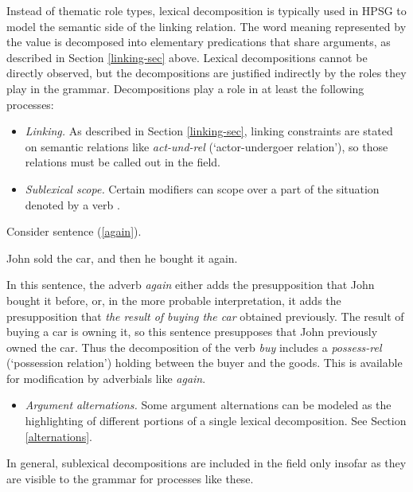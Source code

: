 \documentclass[output=paper
	        ,collection
	        ,collectionchapter
 	        ,biblatex
                ,babelshorthands
                ,newtxmath
                ,draftmode
                ,colorlinks, citecolor=brown
]{langscibook}
\begin{document}
Instead of thematic role types, lexical decomposition is typically used in HPSG to model the semantic side of the linking relation.  The word meaning represented by the \content value is decomposed into elementary predications that share arguments, as described in Section \ref{linking-sec} above.  Lexical decompositions cannot be directly observed, but the decompositions are justified indirectly by the roles they play in the grammar.  Decompositions play a role in at least the following processes:

\begin{itemize}
\item  \textit{Linking.}  As described in Section \ref{linking-sec}, linking constraints are stated on semantic relations like \textit{act-und-rel} (`actor-undergoer relation'), so those relations must be called out in the \content field.
\item \textit{Sublexical scope.}  Certain modifiers can scope over a part of the situation denoted by a verb \citep{Dowty:1979a}.  
\end{itemize}

Consider sentence (\ref{again}).

\begin{exe}
\ex \label{again} John sold the car, and then he bought it again.
\end{exe}

In this sentence, the adverb \textit{again} either adds the presupposition that John bought it before, or, in the more probable interpretation, it adds the presupposition that \textit{the result of buying the car} obtained previously.  The result of buying a car is owning it, so this sentence presupposes that John previously owned the car. Thus the decomposition of the verb \textit{buy} includes a \textit{possess-rel} (`possession relation') holding between the buyer and the goods.  This is available for modification by adverbials like \textit{again}.

\begin{itemize}
\item \textit{Argument alternations.}  Some argument alternations can be modeled as the highlighting of different portions of a single lexical decomposition.  See Section \ref{alternations}.  
\end{itemize}  

\noindent
In general, sublexical decompositions are included in the \content field only insofar as they are visible to the grammar for processes like these.  
\end{document}
